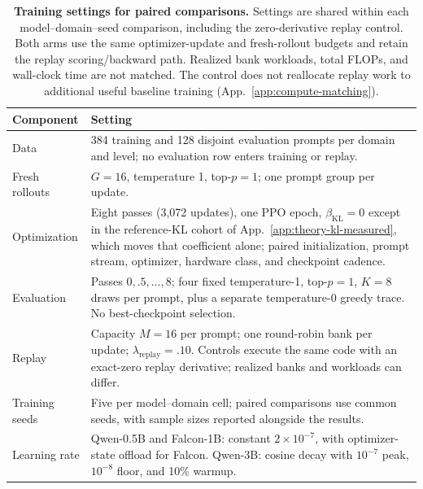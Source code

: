 \documentclass{article}
\newcommand{\1}{\mathbf 1}
\theoremstyle{remark}
\theoremstyle{definition}
\theoremstyle{plain}
\begin{document}
\begin{table}[!htbp]
  \centering
  \caption{\textbf{Training settings for paired comparisons.} Settings are
  shared within each model--domain--seed comparison, including the
  zero-derivative replay control. Both arms use the same optimizer-update and
  fresh-rollout budgets and retain the replay scoring/backward path. Realized
  bank workloads, total FLOPs, and wall-clock time are not matched. The control
  does not reallocate replay work to additional useful baseline training
  (App.~\ref{app:compute-matching}).}
  \label{tab:run-contract}
  \small
  \begin{tabularx}{\linewidth}{@{}P{.23\linewidth}Y@{}}
    \toprule
    \textbf{Component} & \textbf{Setting} \\
    \midrule
    Data & 384 training and 128 disjoint evaluation prompts per domain and
      level; no evaluation row enters training or replay. \\
    Fresh rollouts & $G=16$, temperature 1, top-$p=1$; one prompt group per update. \\
    Optimization & Eight passes (3,072 updates), one PPO epoch,
      $\beta_{\mathrm{KL}}=0$ except in the reference-KL cohort of
      App.~\ref{app:theory-kl-measured}, which moves that coefficient alone;
      paired initialization, prompt stream, optimizer, hardware class, and
      checkpoint cadence. \\
    Evaluation & Passes $0,.5,\ldots,8$; four fixed temperature-1,
      top-$p=1$, $K=8$ draws per prompt, plus a separate temperature-0
      greedy trace. No best-checkpoint selection. \\
    Replay & Capacity $M=16$ per prompt; one round-robin bank per update;
      $\lambda_{\mathrm{replay}}=.10$. Controls execute the same code with
      an exact-zero replay derivative; realized banks and workloads can differ. \\
    Training seeds & Five per model--domain cell; paired comparisons use
      common seeds, with sample sizes reported alongside the results. \\
    Learning rate & Qwen-0.5B and Falcon-1B: constant $2\times10^{-7}$,
      with optimizer-state offload for Falcon. Qwen-3B: cosine decay with
      $10^{-7}$ peak, $10^{-8}$ floor, and 10\% warmup. \\

\end{tabularx}
\end{table}
\end{document}
